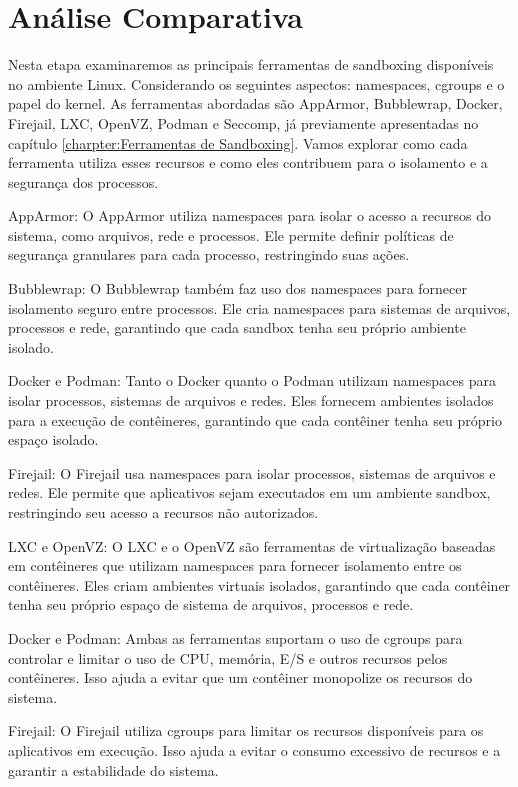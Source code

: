 \chapter{Análise Comparativa}

 Nesta etapa examinaremos as principais ferramentas de sandboxing disponíveis no ambiente Linux. Considerando os seguintes aspectos: namespaces, cgroups e o papel do kernel. As ferramentas abordadas são AppArmor, Bubblewrap, Docker, Firejail, LXC, OpenVZ, Podman e Seccomp, já previamente apresentadas no capítulo \ref{charpter:Ferramentas de Sandboxing}. Vamos explorar como cada ferramenta utiliza esses recursos e como eles contribuem para o isolamento e a segurança dos processos.

    AppArmor: O AppArmor utiliza namespaces para isolar o acesso a recursos do sistema, como arquivos, rede e processos. Ele permite definir políticas de segurança granulares para cada processo, restringindo suas ações.

    Bubblewrap: O Bubblewrap também faz uso dos namespaces para fornecer isolamento seguro entre processos. Ele cria namespaces para sistemas de arquivos, processos e rede, garantindo que cada sandbox tenha seu próprio ambiente isolado.

    Docker e Podman: Tanto o Docker quanto o Podman utilizam namespaces para isolar processos, sistemas de arquivos e redes. Eles fornecem ambientes isolados para a execução de contêineres, garantindo que cada contêiner tenha seu próprio espaço isolado.

    Firejail: O Firejail usa namespaces para isolar processos, sistemas de arquivos e redes. Ele permite que aplicativos sejam executados em um ambiente sandbox, restringindo seu acesso a recursos não autorizados.

    LXC e OpenVZ: O LXC e o OpenVZ são ferramentas de virtualização baseadas em contêineres que utilizam namespaces para fornecer isolamento entre os contêineres. Eles criam ambientes virtuais isolados, garantindo que cada contêiner tenha seu próprio espaço de sistema de arquivos, processos e rede.

    Docker e Podman: Ambas as ferramentas suportam o uso de cgroups para controlar e limitar o uso de CPU, memória, E/S e outros recursos pelos contêineres. Isso ajuda a evitar que um contêiner monopolize os recursos do sistema.

    Firejail: O Firejail utiliza cgroups para limitar os recursos disponíveis para os aplicativos em execução. Isso ajuda a evitar o consumo excessivo de recursos e a garantir a estabilidade do sistema.

